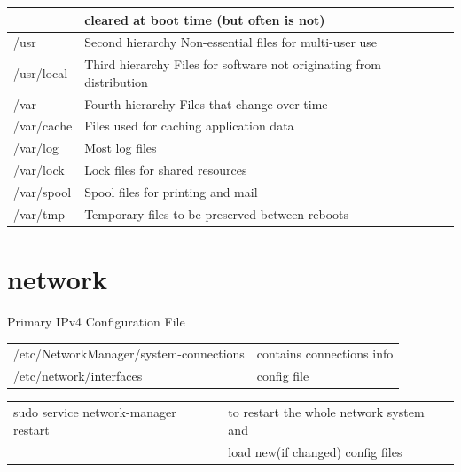 \documentclass[10pt]{article}
\begin{document}
\begin{center}
\begin{tabular}{|l|l|}
							& cleared at boot time (but often is not)
		\\ \hline/usr		&Second hierarchy Non-essential files for multi-user use
		\\ \hline/usr/local	&Third hierarchy Files for software not originating from distribution
		\\ \hline/var		&Fourth hierarchy Files that change over time
		\\ \hline/var/cache	&Files used for caching application data
		\\ \hline/var/log	&Most log files
		\\ \hline/var/lock	&	Lock files for shared resources
		\\ \hline/var/spool	&Spool files for printing and mail
		\\ \hline/var/tmp	&Temporary files to be preserved between reboots\\
		\hline
	\end{tabular}
\end{center}

\section{network}
Primary IPv4 Configuration File\\
\begin{center}
	\begin{tabular}{l l}
		/etc/NetworkManager/system-connections & contains connections info\\
		/etc/network/interfaces &config file\\
	\end{tabular}
\end{center}
\begin{center}
	\begin{tabular}{|l l|}
		\hline
		sudo service network-manager restart &to restart the whole network system and \\
											 &load new(if changed) config files\\
											 \hline
	\end{tabular}
\end{center}
\end{document}
